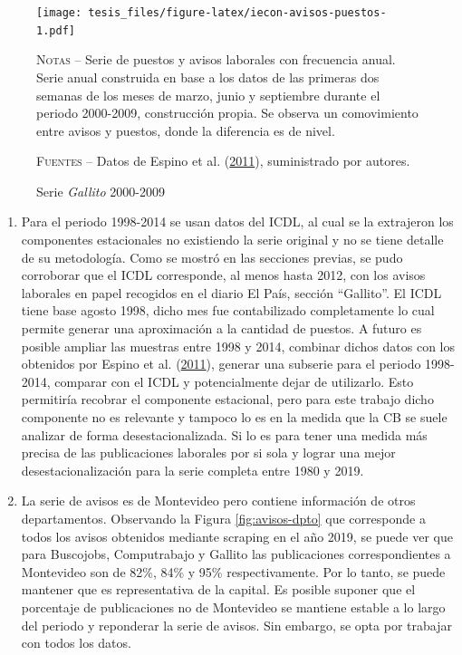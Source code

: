 \documentclass[12pt,oneside]{reedthesis}
\begin{document}
\begin{figure}
\texttt{[image: tesis\_files/figure-latex/iecon-avisos-puestos-1.pdf]}
\caption{Serie \textit{Gallito} 2000-2009}\label{fig:iecon-avisos-puestos}\textsc{}

\footnotesize\textsc{Notas} -- Serie de puestos y avisos laborales con frecuencia anual. Serie anual construida en base a los datos de las primeras dos semanas de los meses de marzo, junio y septiembre durante el periodo 2000-2009, construcción propia. Se observa un comovimiento entre avisos y puestos, donde la diferencia es de nivel.

\textsc{Fuentes} -- Datos de Espino et al. (\protect\hyperlink{ref-Alma2011}{2011}), suministrado por autores.
\end{figure}
\begin{enumerate}
\def\labelenumi{\arabic{enumi}.}
\setcounter{enumi}{1}
\item
  Para el periodo 1998-2014 se usan datos del ICDL, al cual se la extrajeron los componentes estacionales no existiendo la serie original y no se tiene detalle de su metodología. Como se mostró en las secciones previas, se pudo corroborar que el ICDL corresponde, al menos hasta 2012, con los avisos laborales en papel recogidos en el diario El País, sección ``Gallito''. El ICDL tiene base agosto 1998, dicho mes fue contabilizado completamente lo cual permite generar una aproximación a la cantidad de puestos. A futuro es posible ampliar las muestras entre 1998 y 2014, combinar dichos datos con los obtenidos por Espino et al. (\protect\hyperlink{ref-Alma2011}{2011}), generar una subserie para el periodo 1998-2014, comparar con el ICDL y potencialmente dejar de utilizarlo. Esto permitiría recobrar el componente estacional, pero para este trabajo dicho componente no es relevante y tampoco lo es en la medida que la CB se suele analizar de forma desestacionalizada. Si lo es para tener una medida más precisa de las publicaciones laborales por si sola y lograr una mejor desestacionalización para la serie completa entre 1980 y 2019.
\item
  La serie de avisos es de Montevideo pero contiene información de otros departamentos. Observando la Figura \ref{fig:avisos-dpto} que corresponde a todos los avisos obtenidos mediante scraping en el año 2019, se puede ver que para Buscojobs, Computrabajo y Gallito las publicaciones correspondientes a Montevideo son de 82\%, 84\% y 95\% respectivamente. Por lo tanto, se puede mantener que es representativa de la capital. Es posible suponer que el porcentaje de publicaciones no de Montevideo se mantiene estable a lo largo del periodo y reponderar la serie de avisos. Sin embargo, se opta por trabajar con todos los datos.

\end{enumerate}
\end{document}
